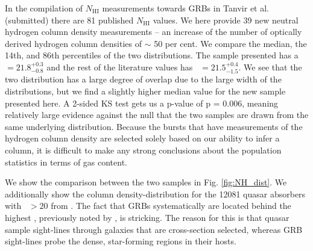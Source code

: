 \documentclass{aa}    %
\begin{document}


In the compilation of $N_{\mathrm{HI}}$ measurements towards GRBs in Tanvir et
al. (submitted) %
there are 81 published $N_{\mathrm{HI}}$ values. We here provide 39 new neutral
hydrogen column density measurements -- an increase of the number of optically
derived hydrogen column densities of $\sim$ 50 per cent. We compare the median,
the 14th, and 86th percentiles of the two distributions. The sample presented
has a \nh~$= 21.8_{-0.8}^{+0.3}$ and the rest of the literature values has
\nh~$= 21.5_{-1.5}^{+0.4}$. We see that the two distribution has a large degree
of overlap due to the large width of the distributions, but we find a slightly
higher median value for the new sample presented here. A 2-sided KS test gets us
a p-value of p = 0.006, meaning relatively large evidence against the null that
the two samples are drawn from the same underlying distribution. Because the
bursts that have measurements of the hydrogen column density are selected solely
based on our ability to infer a column, it is difficult to make any strong
conclusions about the population statistics in terms of gas content.

We show the comparison between the two samples in Fig. \ref{fig:NH_dist}. We
additionally show the column density-distribution for the 12081 quasar absorbers
with \nh~$> 20$ from \citet{Noterdaeme2012b}. The fact that GRBs systematically
are located behind the highest \nh, previously noted by
\citep[e.g.,][]{Prochaska2007, Fynbo2009}, is stricking. The reason for this is
that quasar sample sight-lines through galaxies that are cross-section selected,
whereas GRB sight-lines probe the dense, star-forming regions in their hosts. 
\end{document}
